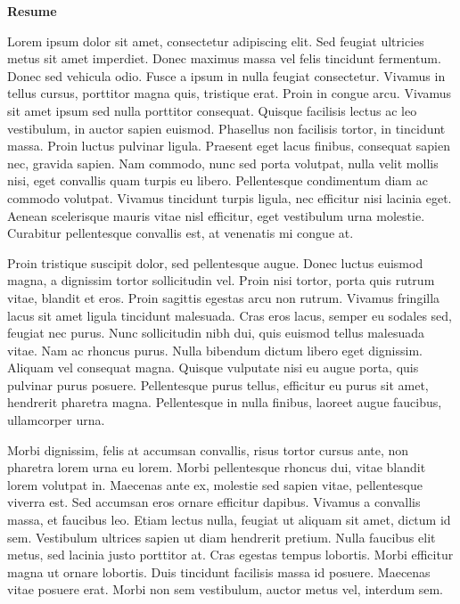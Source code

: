 \thispagestyle{plain}
\begin{right}
    \vspace{0.1cm}
    \Huge
    \textbf{Resume\\}
    \vspace{0.2cm}
\end{right}

Lorem ipsum dolor sit amet, consectetur adipiscing elit. Sed feugiat ultricies metus sit amet imperdiet. Donec maximus massa vel felis tincidunt fermentum. Donec sed vehicula odio. Fusce a ipsum in nulla feugiat consectetur. Vivamus in tellus cursus, porttitor magna quis, tristique erat. Proin in congue arcu. Vivamus sit amet ipsum sed nulla porttitor consequat. Quisque facilisis lectus ac leo vestibulum, in auctor sapien euismod. Phasellus non facilisis tortor, in tincidunt massa. Proin luctus pulvinar ligula. Praesent eget lacus finibus, consequat sapien nec, gravida sapien. Nam commodo, nunc sed porta volutpat, nulla velit mollis nisi, eget convallis quam turpis eu libero. Pellentesque condimentum diam ac commodo volutpat. Vivamus tincidunt turpis ligula, nec efficitur nisi lacinia eget. Aenean scelerisque mauris vitae nisl efficitur, eget vestibulum urna molestie. Curabitur pellentesque convallis est, at venenatis mi congue at.

Proin tristique suscipit dolor, sed pellentesque augue. Donec luctus euismod magna, a dignissim tortor sollicitudin vel. Proin nisi tortor, porta quis rutrum vitae, blandit et eros. Proin sagittis egestas arcu non rutrum. Vivamus fringilla lacus sit amet ligula tincidunt malesuada. Cras eros lacus, semper eu sodales sed, feugiat nec purus. Nunc sollicitudin nibh dui, quis euismod tellus malesuada vitae. Nam ac rhoncus purus. Nulla bibendum dictum libero eget dignissim. Aliquam vel consequat magna. Quisque vulputate nisi eu augue porta, quis pulvinar purus posuere. Pellentesque purus tellus, efficitur eu purus sit amet, hendrerit pharetra magna. Pellentesque in nulla finibus, laoreet augue faucibus, ullamcorper urna.

Morbi dignissim, felis at accumsan convallis, risus tortor cursus ante, non pharetra lorem urna eu lorem. Morbi pellentesque rhoncus dui, vitae blandit lorem volutpat in. Maecenas ante ex, molestie sed sapien vitae, pellentesque viverra est. Sed accumsan eros ornare efficitur dapibus. Vivamus a convallis massa, et faucibus leo. Etiam lectus nulla, feugiat ut aliquam sit amet, dictum id sem. Vestibulum ultrices sapien ut diam hendrerit pretium. Nulla faucibus elit metus, sed lacinia justo porttitor at. Cras egestas tempus lobortis. Morbi efficitur magna ut ornare lobortis. Duis tincidunt facilisis massa id posuere. Maecenas vitae posuere erat. Morbi non sem vestibulum, auctor metus vel, interdum sem.